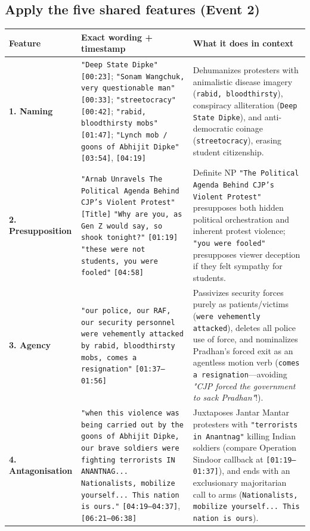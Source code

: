 \documentclass[10pt,a4paper]{article}
\begin{document}
\subsection*{Apply the five shared features (Event 2)}
\begin{longtable}{@{}>{\raggedright\arraybackslash}p{} >{\raggedright\arraybackslash}p{} >{\raggedright\arraybackslash}p{}@{}}
\toprule
\textbf{Feature} & \textbf{Exact wording + timestamp} & \textbf{What it does in context} \\
\midrule
\endhead
\textbf{1. Naming} & \texttt{"Deep State Dipke"} \texttt{[00:23]}; \texttt{"Sonam Wangchuk, very questionable man"} \texttt{[00:33]}; \texttt{"streetocracy"} \texttt{[00:42]}; \texttt{"rabid, bloodthirsty mobs"} \texttt{[01:47]}; \texttt{"Lynch mob / goons of Abhijit Dipke"} \texttt{[03:54]}, \texttt{[04:19]} & Dehumanizes protesters with animalistic disease imagery (\texttt{rabid, bloodthirsty}), conspiracy alliteration (\texttt{Deep State Dipke}), and anti-democratic coinage (\texttt{streetocracy}), erasing student citizenship. \\
\addlinespace[4pt]
\textbf{2. Presupposition} & \texttt{"Arnab Unravels The Political Agenda Behind CJP's Violent Protest"} \texttt{[Title]} \newline  \texttt{"Why are you, as Gen Z would say, so shook tonight?"} \texttt{[01:19]} \newline  \texttt{"these were not students, you were fooled"} \texttt{[04:58]} & Definite NP \texttt{"The Political Agenda Behind CJP's Violent Protest"} presupposes both hidden political orchestration and inherent protest violence; \texttt{"you were fooled"} presupposes viewer deception if they felt sympathy for students. \\
\addlinespace[4pt]
\textbf{3. Agency} & \texttt{"our police, our RAF, our security personnel were vehemently attacked by rabid, bloodthirsty mobs, comes a resignation"} \texttt{[01:37--01:56]} & Passivizes security forces purely as patients/victims (\texttt{were vehemently attacked}), deletes all police use of force, and nominalizes Pradhan's forced exit as an agentless motion verb (\texttt{comes a resignation}---avoiding \textit{"CJP forced the government to sack Pradhan"}!). \\
\addlinespace[4pt]
\textbf{4. Antagonisation} & \texttt{"when this violence was being carried out by the goons of Abhijit Dipke, our brave soldiers were fighting terrorists IN ANANTNAG... Nationalists, mobilize yourself... This nation is ours."} \texttt{[04:19--04:37]}, \texttt{[06:21--06:38]} & Juxtaposes Jantar Mantar protesters with \texttt{"terrorists in Anantnag"} killing Indian soldiers (compare Operation Sindoor callback at \texttt{[01:19--01:37]}), and ends with an exclusionary majoritarian call to arms (\texttt{Nationalists, mobilize yourself... This nation is ours}). \\

\end{longtable}
\end{document}
